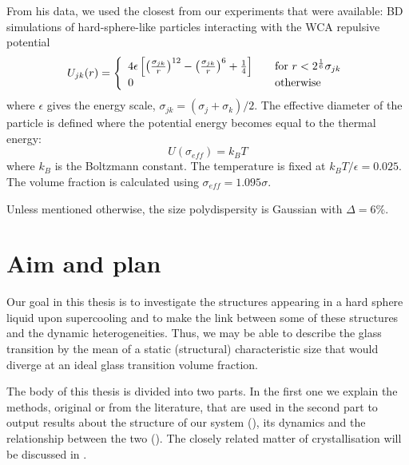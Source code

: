 From his data, we used the closest from our experiments that were available: \ac{BD} simulations of hard-sphere-like particles interacting with the \ac{WCA} repulsive potential
\begin{equation}
	U_{jk}(r) = \left\{\begin{array}{l l}
  		4\epsilon\left[ \left( \frac{\sigma_{jk}}{r}\right)^{12} - \left( \frac{\sigma_{jk}}{r}\right)^{6} +\frac{1}{4}\right]  & \quad \text{for $r<2^\frac{1}{6} \sigma_{jk}$}\\
  		0 & \quad \text{otherwise}
  	\end{array} \right.
	\label{eq:WCA}
\end{equation}
where $\epsilon$ gives the energy scale, $\sigma_{jk} = (\sigma_j + \sigma_k)/2$. The effective diameter of the particle is defined where the potential energy becomes equal to the thermal energy:
\begin{equation}
	U(\sigma_{eff}) = k_B T
\end{equation}
where $k_B$ is the Boltzmann constant. The temperature is fixed at $k_B T/\epsilon = 0.025$. The volume fraction is calculated using $\sigma_{eff} = 1.095\sigma$.

Unless mentioned otherwise, the size polydispersity is Gaussian with $\Delta=6\%$.

\section{Aim and plan}

Our goal in this thesis is to investigate the structures appearing in a hard sphere liquid upon supercooling and to make the link between some of these structures and the dynamic heterogeneities. Thus, we may be able to describe the glass transition by the mean of a static (structural) characteristic size that would diverge at an ideal glass transition volume fraction.

The body of this thesis is divided into two parts. In the first one we explain the methods, original or from the literature, that are used in the second part to output results about the structure of our system (), its dynamics and the relationship between the two (). The closely related matter of crystallisation will be discussed in .